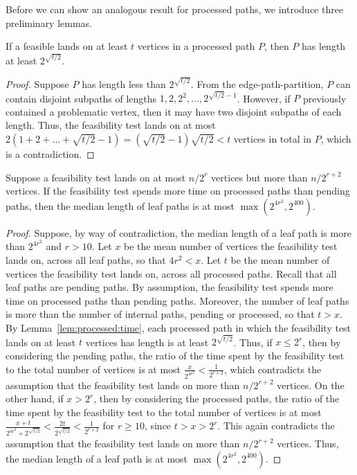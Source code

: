 \noindent
Before we can show an analogous result for processed paths, we introduce three preliminary lemmas.

\begin{lemma}
\label{lem:processed:time}
If a feasible lands on at least $t$ vertices in a processed path $P$, then $P$ has length at least $2^{\sqrt{t/2}}$.
\end{lemma}
\begin{proof}
Suppose $P$ has length less than $2^{\sqrt{t/2}}$. 
From the edge-path-partition, $P$ can contain disjoint subpaths of lengths $1,2,2^2,\ldots,2^{\sqrt{t/2}-1}$. 
However, if $P$ previously contained a problematic vertex, then it may have two disjoint subpaths of each length. 
Thus, the feasibility test lands on at most $2(1+2+\ldots+\sqrt{t/2}-1)=(\sqrt{t/2}-1)\sqrt{t/2}<t$ vertices in total in $P$, which is a contradiction.
\end{proof}

\begin{lemma}
\label{lem:median:leaf}
Suppose a feasibility test lands on at most $n/2^r$ vertices but more than $n/2^{r+2}$ vertices. If the feasibility test spends more time on processed paths than pending paths, then the median length of leaf paths is at most $\max(2^{4r^2},2^{400})$.
\end{lemma}
\begin{proof}
Suppose, by way of contradiction, the median length of a leaf path is more than $2^{4r^2}$ and $r>10$. 
Let $x$ be the mean number of vertices the feasibility test lands on, across all leaf paths, so that $4r^2<x$. 
Let $t$ be the mean number of vertices the feasibility test lands on, across all processed paths. 
Recall that all leaf paths are pending paths. 
By assumption, the feasibility test spends more time on processed paths than pending paths. 
Moreover, the number of leaf paths is more than the number of internal paths, pending or processed, so that $t>x$. 
By Lemma~\ref{lem:processed:time}, each processed path in which the feasibility test lands on at least $t$ vertices has length is at least $2^{\sqrt{t/2}}$. 
Thus, if $x\le 2^r$, then by considering the pending paths, the ratio of the time spent by the feasibility test to the total number of vertices is at most $\frac{x}{2^{4r^2}}<\frac{1}{2^{r+2}}$, which contradicts the assumption that the feasibility test lands on more than $n/2^{r+2}$ vertices.
On the other hand, if $x>2^r$, then by considering the processed paths, the ratio of the time spent by the feasibility test to the total number of vertices is at most $\frac{x+t}{2^{4r^2}+2^{\sqrt{t/2}}}<\frac{2t}{2^{\sqrt{t/2}}}<\frac{1}{2^{r+2}}$ for $r\ge10$, since $t>x>2^r$. 
This again contradicts the assumption that the feasibility test lands on more than $n/2^{r+2}$ vertices.
Thus, the median length of a leaf path is at most $\max(2^{4r^2},2^{400})$.
\end{proof}

